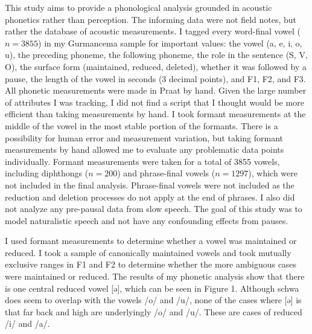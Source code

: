 \documentclass[output=paper,newtxmath,modfonts,nonflat,draftmode]{langsci/langscibook}
\begin{document}
This study aims to provide a phonological analysis grounded in acoustic phonetics rather than perception. The informing data were not field notes, but rather the database of acoustic measurements. I tagged every word-final vowel ($n=3855$) in my Gurmancema sample for important values: the vowel (a, e, i, o, u), the preceding phoneme, the following phoneme, the role in the sentence (S, V, O), the surface form (maintained, reduced, deleted), whether it was followed by a pause, the length of the vowel in seconds (3 decimal points), and F1, F2, and 
F3. All phonetic measurements were made in Praat \citep{Boersma1996} by hand. Given the large number of attributes I was tracking, I did not find a script that I thought would be more efficient than taking measurements by hand. I took formant measurements at the middle of the vowel in the most stable portion of the formants. There is a possibility for human error and measurement variation, but taking formant measurements by hand allowed me to evaluate any problematic data points individually. Formant measurements were taken for a total of 3855 vowels, including diphthongs ($n=200$) and phrase-final vowels ($n=1297$), which were not included in the final 
analysis. Phrase-final vowels were not included as the reduction and deletion processes do not apply at the end of phrases. I also did not analyze any pre-pausal data from slow speech. The goal of this study was to model naturalistic speech and not have any confounding effects from pauses. 

I used formant measurements to determine whether a vowel was maintained or reduced. I took a sample of canonically maintained vowels and took mutually exclusive ranges in F1 and F2 to determine whether the more ambiguous cases were maintained or reduced. The results of my phonetic analysis show that there is one central reduced vowel [ə], which can be seen in Figure 1. Although schwa does seem to overlap with the vowels /o/ and /u/, none of the cases where [ə] is that far back and high are underlyingly /o/ and /u/. These are cases of reduced /i/ and /a/.
\end{document}
